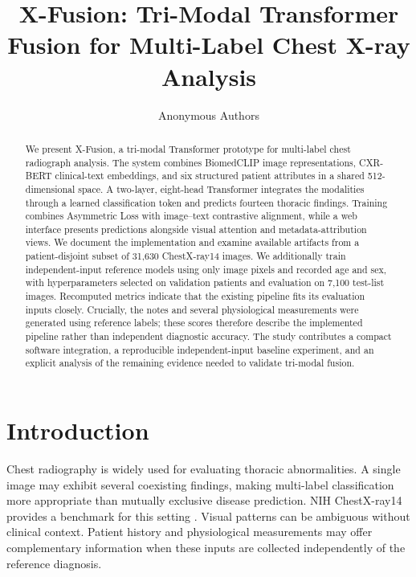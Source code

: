 \documentclass[runningheads,a4paper]{llncs}
\begin{document}
\title{X-Fusion: Tri-Modal Transformer Fusion for Multi-Label Chest X-ray Analysis}
\author{Anonymous Authors}
\maketitle
\begin{abstract}
We present X-Fusion, a tri-modal Transformer prototype for multi-label chest radiograph analysis. The system combines BiomedCLIP image representations, CXR-BERT clinical-text embeddings, and six structured patient attributes in a shared 512-dimensional space. A two-layer, eight-head Transformer integrates the modalities through a learned classification token and predicts fourteen thoracic findings. Training combines Asymmetric Loss with image--text contrastive alignment, while a web interface presents predictions alongside visual attention and metadata-attribution views. We document the implementation and examine available artifacts from a patient-disjoint subset of 31,630 ChestX-ray14 images. We additionally train independent-input reference models using only image pixels and recorded age and sex, with hyperparameters selected on validation patients and evaluation on 7,100 test-list images. Recomputed metrics indicate that the existing pipeline fits its evaluation inputs closely. Crucially, the notes and several physiological measurements were generated using reference labels; these scores therefore describe the implemented pipeline rather than independent diagnostic accuracy. The study contributes a compact software integration, a reproducible independent-input baseline experiment, and an explicit analysis of the remaining evidence needed to validate tri-modal fusion.
\end{abstract}
\section{Introduction}

Chest radiography is widely used for evaluating thoracic abnormalities. A single image may exhibit several coexisting findings, making multi-label classification more appropriate than mutually exclusive disease prediction. NIH ChestX-ray14 provides a benchmark for this setting \cite{wang2017,nihdataset}. Visual patterns can be ambiguous without clinical context. Patient history and physiological measurements may offer complementary information when these inputs are collected independently of the reference diagnosis.
\end{document}
